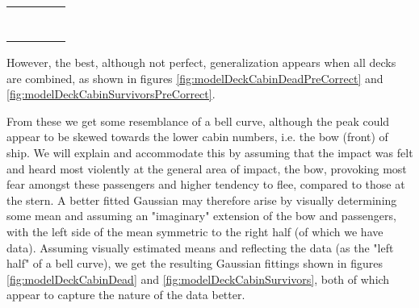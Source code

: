\documentclass[11.5pt]{article}
\begin{document}
\begin{center}
	\begin{tabular}[!ht]{C{0.22\linewidth}C{0.22\linewidth}} 
		 &  \\
		&  \\
		&  \\
		&  \\
		&  \\	
		&  \\
		&  \\
	\end{tabular}
		\label{table:deckCabins}		
\end{center}

However, the best, although not perfect, generalization appears when all decks are combined, as shown in figures \ref{fig:modelDeckCabinDeadPreCorrect} and  \ref{fig:modelDeckCabinSurvivorsPreCorrect}. 




From these we get some resemblance of a bell curve, although the peak could appear to be skewed towards the lower cabin numbers, i.e. the bow (front) of ship. We will explain and accommodate this by assuming that the impact was felt and heard most violently at the general area of impact, the bow, provoking most fear amongst these passengers and higher tendency to flee, compared to those at the stern. A better fitted Gaussian may therefore arise by visually determining some mean and assuming an "imaginary" extension of the bow and passengers, with the left side of the mean symmetric to the right half  (of which we have data). Assuming visually estimated means and reflecting the data (as the "left half" of a bell curve), we get the resulting Gaussian fittings shown in figures \ref{fig:modelDeckCabinDead} and  \ref{fig:modelDeckCabinSurvivors}, both of which appear to capture the nature of the data better.
\end{document}
